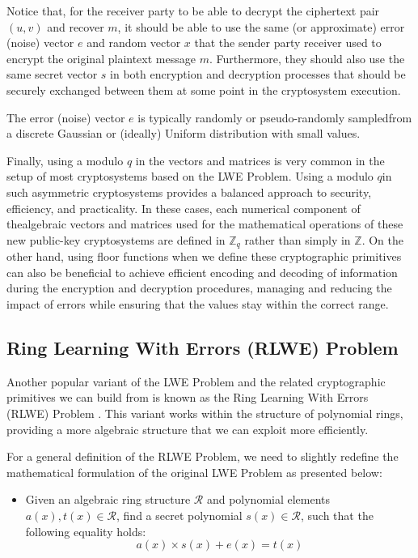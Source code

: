 \documentclass[runningheads]{llncs}
\numberwithin{equation}{section}
\begin{document}
    \noindent Notice that, for the receiver party to be able to decrypt the ciphertext pair $(u, v)$ and recover $m$, it should be able to use the same (or approximate) error (noise) vector $e$ and random vector $x$ that the sender party receiver used to encrypt the original plaintext message $m$. Furthermore, they should also use the same secret vector $s$ in both encryption and decryption processes that should be securely exchanged between them at some point in the cryptosystem execution.

    The error (noise) vector $e$ is typically randomly or pseudo-randomly sampled\break from a discrete Gaussian or (ideally) Uniform distribution with small values.
    
    Finally, using a modulo $q$ in the vectors and matrices is very common in the setup of most cryptosystems based on the LWE Problem. Using a modulo $q$\break in such asymmetric cryptosystems provides a balanced approach to security, efficiency, and practicality. In these cases, each numerical component of the\break algebraic vectors and matrices used for the mathematical operations of these new public-key cryptosystems are defined in ${\mathbb{Z}}_{q}$ rather than simply in $\mathbb{Z}$. On the other hand, using floor functions when we define these cryptographic primitives can also be beneficial to achieve efficient encoding and decoding of information during the encryption and decryption procedures, managing and reducing the impact of errors while ensuring that the values stay within the correct range.

    \clearpage

    
    \subsection{Ring Learning With Errors (RLWE) Problem}
    \label{subsec:ring-learning-with-errors-problem}

    Another popular variant of the LWE Problem and the related cryptographic primitives we can build from is known as the Ring Learning With Errors (RLWE) Problem \cite{lyubashevsky-peikert-regev:ideal-lattices-and-learning-with-errors-over-rings:2013:06-2024,peikert:lattice-cryptography-for-internet:2014:06-2024}. This variant works within the structure of polynomial rings, providing a more algebraic structure that we can exploit more efficiently.

    \vspace{2ex}
    
    \noindent For a general definition of the RLWE Problem, we need to slightly redefine the mathematical formulation of the original LWE Problem as presented below:
    \begin{itemize}
        \item Given an algebraic ring structure $\mathcal{R}$ and polynomial elements $a(x), t(x) \in \mathcal{R}$, find a secret polynomial $s(x) \in \mathcal{R}$, such that the following equality holds:
        $$ a(x) \times s(x) + e(x) = t(x) $$
    \end{itemize}
\end{document}
